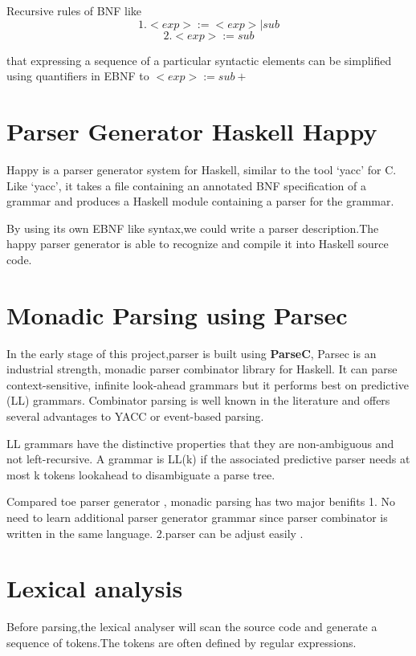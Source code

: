 Recursive rules of BNF like 
\[   1. <exp> := <exp> | sub \]
\[	 2. <exp> := sub     \]
 
that expressing a sequence of a particular syntactic elements can be simplified using quantifiers in EBNF to $ <exp>:=sub+ $



\section{Parser Generator Haskell Happy}
Happy is a parser generator system for Haskell, similar to the tool `yacc' for C. Like `yacc', it takes a file containing an annotated BNF specification of a grammar and produces a Haskell module containing a parser for the grammar.
\cite{happy}

By using its own EBNF like syntax,we could write a parser description.The happy parser generator is able to recognize and compile it into Haskell source code.


\section{Monadic Parsing using Parsec}
In the early stage of this project,parser is built using \textbf{ParseC},
Parsec is an industrial strength, monadic parser combinator library for Haskell. It can parse context-sensitive, infinite look-ahead grammars but it performs best on
predictive (LL\cite{aho1986compilers}) grammars. Combinator parsing is well known in the literature
and offers several advantages to YACC or event-based parsing. \cite{leijen2001parsec}

LL grammars have the distinctive properties that they are non-ambiguous and
not left-recursive. A grammar is LL(k) if the associated predictive parser needs
at most k tokens lookahead to disambiguate a parse tree.\cite{real_parsec}


Compared toe parser generator , monadic parsing has two major benifits
1. No need to learn additional parser generator grammar since parser combinator is written in the same language. 2.parser can be adjust easily .


\section{Lexical analysis}
Before parsing,the lexical analyser will scan the source code and generate a sequence of tokens.The tokens are often defined by regular expressions.

